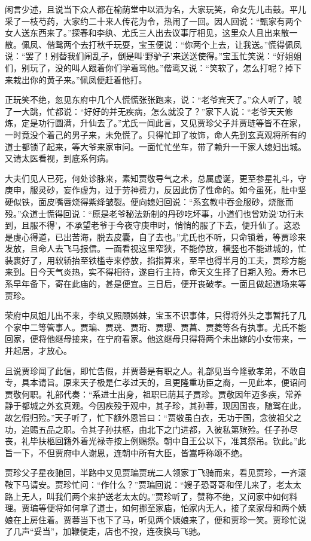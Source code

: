 \documentclass[12pt,oneside]{book}
\begin{document}
闲言少述，且说当下众人都在榆荫堂中以酒为名，大家玩笑，命女先儿击鼓。平儿采了一枝芍药，大家约二十来人传花为令，热闹了一回。因人回说：“甄家有两个女人送东西来了。”探春和李纨、尤氏三人出去议事厅相见，这里众人且出来散一散。佩凤、偕鸳两个去打秋千玩耍，宝玉便说：“你两个上去，让我送。”慌得佩凤说：“罢了！别替我们闹乱子，倒是叫‘野驴子’来送送使得。”宝玉忙笑说：“好姐姐们，别玩了，没的叫人跟着你们学着骂他。”偕鸾又说：“笑软了，怎么打呢？掉下来栽出你的黄子来。”佩凤便赶着他打。

正玩笑不绝，忽见东府中几个人慌慌张张跑来，说：“老爷宾天了。”众人听了，唬了一大跳，忙都说：“好好的并无疾病，怎么就没了？”家下人说：“老爷天天修炼，定是功行圆满，升仙去了。”尤氏一闻此言，又见贾珍父子并贾琏等皆不在家，一时竟没个着己的男子来，未免慌了。只得忙卸了妆饰，命人先到玄真观将所有的道士都锁了起来，等大爷来家审问。一面忙忙坐车，带了赖升一干家人媳妇出城。又请太医看视，到底系何病。

大夫们见人已死，何处诊脉来，素知贾敬导气之术，总属虚诞，更至参星礼斗，守庚申，服灵砂，妄作虚为，过于劳神费力，反因此伤了性命的。如今虽死，肚中坚硬似铁，面皮嘴唇烧得紫绛皱裂。便向媳妇回说：“系玄教中吞金服砂，烧胀而殁。”众道士慌得回说：“原是老爷秘法新制的丹砂吃坏事，小道们也曾劝说‘功行未到，且服不得’，不承望老爷于今夜守庚申时，悄悄的服了下去，便升仙了。这恐是虔心得道，已出苦海，脱去皮囊，自了去也。”尤氏也不听，只命锁着，等贾珍来发放，且命人去飞马报信。一面看视这里窄狭，不能停放，横竖也不能进城的，忙装裹好了，用软轿抬至铁槛寺来停放，掐指算来，至早也得半月的工夫，贾珍方能来到。目今天气炎热，实不得相待，遂自行主持，命天文生择了日期入殓。寿木已系早年备下，寄在此庙的，甚是便宜。三日后，便开丧破孝。一面且做起道场来等贾珍。

荣府中凤姐儿出不来，李纨又照顾姊妹，宝玉不识事体，只得将外头之事暂托了几个家中二等管事人。贾㻞、贾珖、贾珩、贾璎、贾菖、贾菱等各有执事。尤氏不能回家，便将他继母接来，在宁府看家。他这继母只得将两个未出嫁的小女带来，一并起居，才放心。

且说贾珍闻了此信，即忙告假，并贾蓉是有职之人。礼部见当今隆敦孝弟，不敢自专，具本请旨。原来天子极是仁孝过天的，且更隆重功臣之裔，一见此本，便诏问贾敬何职。礼部代奏：“系进士出身，祖职已荫其子贾珍。贾敬因年迈多疾，常养静于都城之外玄真观。今因疾殁于观中，其子珍，其孙蓉，现因国丧，随驾在此，故乞假归殓。”天子听了，忙下额外恩旨曰：“贾敬虽白衣，无功于国，念彼祖父之功，追赐五品之职。令其子孙扶柩，由北下之门进都，入彼私第殡殓。任子孙尽丧，礼毕扶柩回籍外着光禄寺按上例赐祭。朝中自王公以下，准其祭吊。钦此。”此旨一下，不但贾府中人谢恩，连朝中所有大臣，皆嵩呼称颂不绝。

贾珍父子星夜驰回，半路中又见贾㻞贾珖二人领家丁飞骑而来，看见贾珍，一齐滚鞍下马请安。贾珍忙问：“作什么？”贾㻞回说：“嫂子恐哥哥和侄儿来了，老太太路上无人，叫我们两个来护送老太太的。”贾珍听了，赞称不绝，又问家中如何料理。贾㻞等便将如何拿了道士，如何挪至家庙，怕家内无人，接了亲家母和两个姨娘在上房住着。贾蓉当下也下了马，听见两个姨娘来了，便和贾珍一笑。贾珍忙说了几声“妥当”，加鞭便走，店也不投，连夜换马飞驰。
\end{document}
